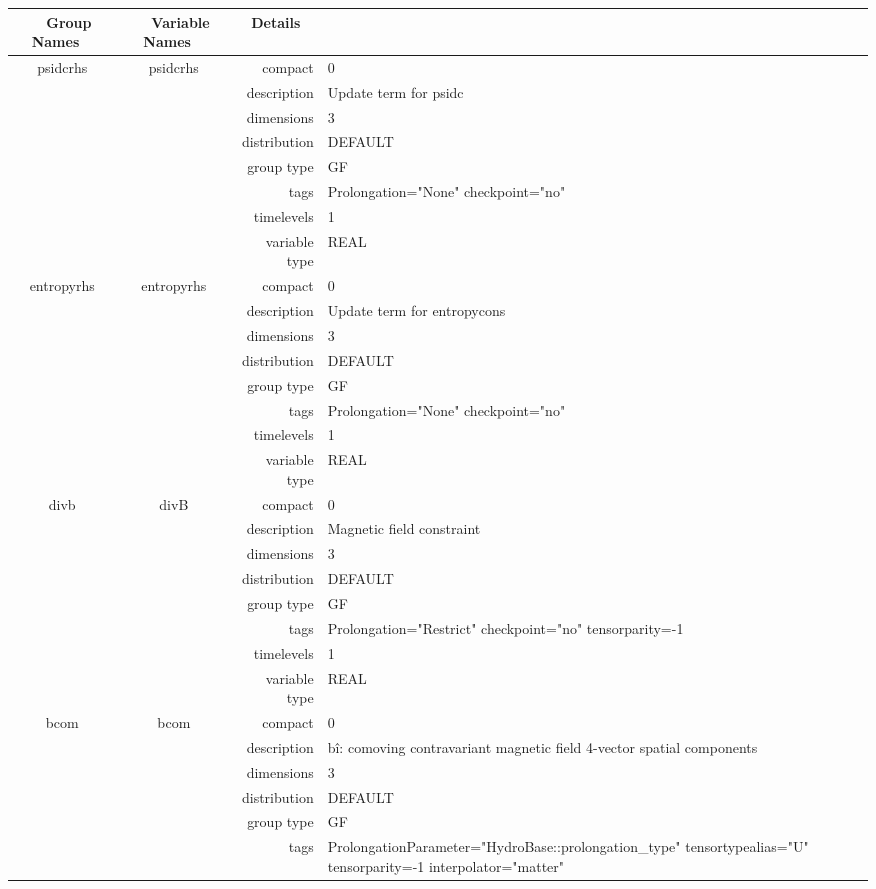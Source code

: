 \begin{tabular*}{150mm}{|c|c@{\extracolsep{\fill}}|rl|} \hline 
~ {\bf Group Names} ~ & ~ {\bf Variable Names} ~  &{\bf Details} ~ & ~ \\ 
\hline 
psidcrhs & psidcrhs & compact & 0 \\ 
 &  & description & Update term for psidc \\ 
 &  & dimensions & 3 \\ 
 &  & distribution & DEFAULT \\ 
 &  & group type & GF \\ 
 &  & tags & Prolongation="None" checkpoint="no" \\ 
 &  & timelevels & 1 \\ 
 &  & variable type & REAL \\ 
\hline 
entropyrhs & entropyrhs & compact & 0 \\ 
 &  & description & Update term for entropycons \\ 
 &  & dimensions & 3 \\ 
 &  & distribution & DEFAULT \\ 
 &  & group type & GF \\ 
 &  & tags & Prolongation="None" checkpoint="no" \\ 
 &  & timelevels & 1 \\ 
 &  & variable type & REAL \\ 
\hline 
divb & divB & compact & 0 \\ 
 &  & description & Magnetic field constraint \\ 
 &  & dimensions & 3 \\ 
 &  & distribution & DEFAULT \\ 
 &  & group type & GF \\ 
 &  & tags & Prolongation="Restrict" checkpoint="no" tensorparity=-1 \\ 
 &  & timelevels & 1 \\ 
 &  & variable type & REAL \\ 
\hline 
bcom & bcom & compact & 0 \\ 
 &  & description & b\^i: comoving contravariant magnetic field 4-vector spatial components \\ 
 &  & dimensions & 3 \\ 
 &  & distribution & DEFAULT \\ 
 &  & group type & GF \\ 
 &  & tags & ProlongationParameter="HydroBase::prolongation\_type" tensortypealias="U" tensorparity=-1 interpolator="matter" \\ 

\end{tabular*}
